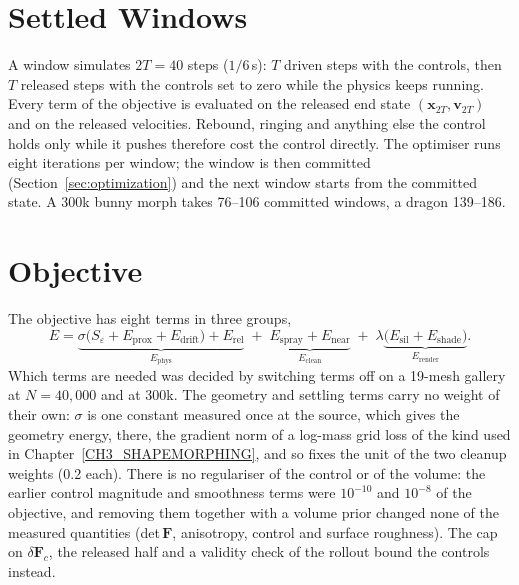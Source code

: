 \section{Settled Windows}
\label{ch4:sec_windows}

A window simulates $2T=40$ steps ($1/6$\,s): $T$ driven steps with the controls, then $T$ released steps with the
controls set to zero while the physics keeps running. Every term of the objective is evaluated on the released end
state $(\mathbf{x}_{2T},\mathbf{v}_{2T})$ and on the released velocities. Rebound, ringing and anything else the
control holds only while it pushes therefore cost the control directly. The optimiser runs eight iterations per
window; the window is then committed (Section~\ref{sec:optimization}) and the next window starts from the committed
state. A 300k bunny morph takes 76--106 committed windows, a dragon 139--186.

\section{Objective}
\label{ch4:sec_objective}

The objective has eight terms in three groups,
\begin{equation}
\label{ch4:eq_objective}
E=\underbrace{\sigma\big(S_\varepsilon+E_{\mathrm{prox}}+E_{\mathrm{drift}}\big)+E_{\mathrm{rel}}}_{E_{\mathrm{phys}}}
 \;+\;\underbrace{E_{\mathrm{spray}}+E_{\mathrm{near}}}_{E_{\mathrm{clean}}}
 \;+\;\lambda\underbrace{\big(E_{\mathrm{sil}}+E_{\mathrm{shade}}\big)}_{E_{\mathrm{render}}} .
\end{equation}
Which terms are needed was decided by switching terms off on a 19-mesh gallery at $N=40{,}000$ and at 300k. The
geometry and settling terms carry no weight of their own: $\sigma$ is one constant measured once at the source, which
gives the geometry energy, there, the gradient norm of a log-mass grid loss of the kind used in
Chapter~\ref{CH3_SHAPEMORPHING}, and so fixes the unit of the two cleanup weights (0.2 each). There is no regulariser of the control or of the volume: the earlier
control magnitude and smoothness terms were $10^{-10}$ and $10^{-8}$ of the objective, and removing them together
with a volume prior changed none of the measured quantities (det\,$\mathbf{F}$, anisotropy, control and surface
roughness). The cap on $\delta\mathbf{F}_c$, the released half and a validity check of the rollout bound the
controls instead.

